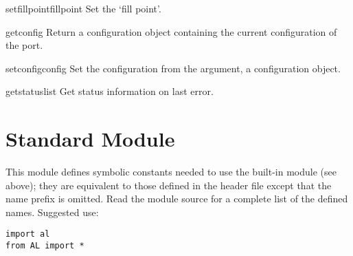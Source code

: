 \begin{methoddesc}{setfillpoint}{fillpoint}
Set the `fill point'.
\end{methoddesc}

\begin{methoddesc}{getconfig}{}
Return a configuration object containing the current configuration of
the port.
\end{methoddesc}

\begin{methoddesc}{setconfig}{config}
Set the configuration from the argument, a configuration object.
\end{methoddesc}

\begin{methoddesc}{getstatus}{list}
Get status information on last error.
\end{methoddesc}


\section{Standard Module }



This module defines symbolic constants needed to use the built-in
module  (see above); they are equivalent to those defined
in the \C{} header file  except that the name prefix
 is omitted.  Read the module source for a complete list of
the defined names.  Suggested use:

\begin{verbatim}
import al
from AL import *
\end{verbatim}
